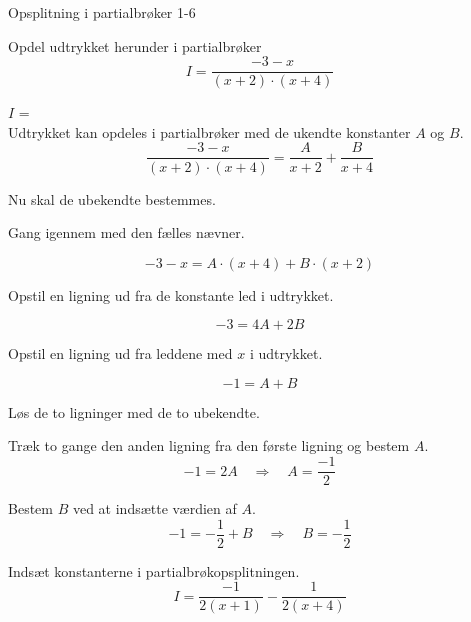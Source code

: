 \documentclass{article}
\begin{document}
\begin{exercise}{Opsplitning i partialbrøker 1-6}
	
	Opdel udtrykket herunder i partialbrøker
	\[
	I = \frac{-3 - x}{(x + 2) \cdot (x + 4)}
	\]
	
	$I$ =  \\
	
	\hint
	Udtrykket kan opdeles i partialbrøker med de ukendte konstanter $A$ og $B$.
	\[
	\frac{-3 - x}{(x + 2) \cdot (x + 4)} = 
	\frac{A}{x + 2} + \frac{B}{x + 4}
	\]
	
	\hint
	Nu skal de ubekendte bestemmes.
	
	\hint
	Gang igennem med den fælles nævner.
	
	\hint
	\[
	-3 - x = A \cdot (x + 4) + B \cdot (x + 2)
	\]
	
	\hint
	Opstil en ligning ud fra de konstante led i udtrykket.
	
	\hint
	\[
	-3 = 4A+ 2B
	\]
	
	\hint
	Opstil en ligning ud fra leddene med $x$ i udtrykket.
	
	\hint
	\[
	-1 = A + B
	\]
	
	\hint
	Løs de to ligninger med de to ubekendte.
	
	\hint
	Træk to gange den anden ligning fra den første ligning og bestem $A$.
	\[
	-1 = 2A \quad	\Rightarrow		\quad		A = \frac{-1}{2}
	\]
	
	\hint
	Bestem $B$ ved at indsætte værdien af $A$.
	\[
	-1 =  -\frac{1}{2} + B \quad 	\Rightarrow		\quad B = -\frac{1}{2}
	\]
	
	\hint
	Indsæt konstanterne i partialbrøkopsplitningen.
	\[
	I = \frac{-1}{2(x+1)} - \frac{1}{2(x+4)}
	\]
	
	
	
\end{exercise}
\end{document}
